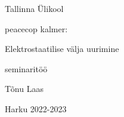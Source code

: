 \begin{titlepage}
\par{Tallinna Ülikool}
\vspace{0.3\textheight}
\par{peacecop kalmer:}
\LARGE
\par{Elektrostaatilise välja uurimine}
\normalsize
\par{seminaritöö}
\vspace{0.3\textheight}
\begin{flushright}
\par{Tõnu Laas}
\end{flushright}
		\vfill
Harku
\hfill
2022-2023
\end{titlepage}
